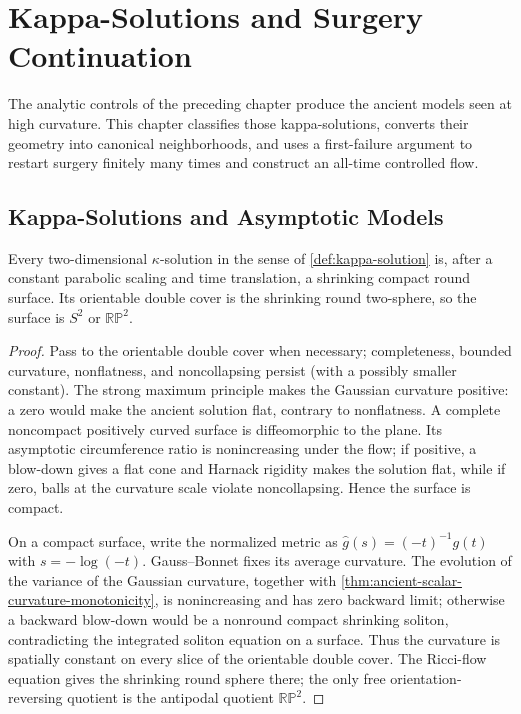 \chapter{Kappa-Solutions and Surgery Continuation}

The analytic controls of the preceding chapter produce the ancient models
seen at high curvature.  This chapter classifies those kappa-solutions,
converts their geometry into canonical neighborhoods, and uses a first-failure
argument to restart surgery finitely many times and construct an all-time
controlled flow.

\section{Kappa-Solutions and Asymptotic Models}

\begin{theorem}
\label{thm:two-dimensional-kappa-solutions-round}
\notready
Every two-dimensional $\kappa$-solution in the sense of
\ref{def:kappa-solution} is, after a constant parabolic scaling and time
translation, a shrinking compact round surface.  Its orientable double cover
is the shrinking round two-sphere, so the surface is $S^2$ or
$\mathbb{RP}^2$.
\end{theorem}

\begin{proof}
Pass to the orientable double cover when necessary; completeness, bounded
curvature, nonflatness, and noncollapsing persist (with a possibly smaller
constant).  The strong maximum principle makes the Gaussian curvature positive: a zero
would make the ancient solution flat, contrary to nonflatness.  A complete
noncompact positively curved surface is diffeomorphic to the plane.  Its
asymptotic circumference ratio is nonincreasing under the flow; if positive,
a blow-down gives a flat cone and Harnack rigidity makes the solution flat,
while if zero, balls at the curvature scale violate noncollapsing.  Hence the
surface is compact.

On a compact surface, write the normalized metric as
$\widehat g(s)=(-t)^{-1}g(t)$ with $s=-\log(-t)$.  Gauss--Bonnet fixes its
average curvature.  The evolution of the variance of the Gaussian curvature,
together with \ref{thm:ancient-scalar-curvature-monotonicity}, is
nonincreasing and has zero backward limit; otherwise a backward blow-down
would be a nonround compact shrinking soliton, contradicting the integrated
soliton equation on a surface.  Thus the curvature is spatially constant on
every slice of the orientable double cover.  The Ricci-flow equation gives the
shrinking round sphere there; the only free orientation-reversing quotient is
the antipodal quotient $\mathbb{RP}^2$.
\end{proof}


